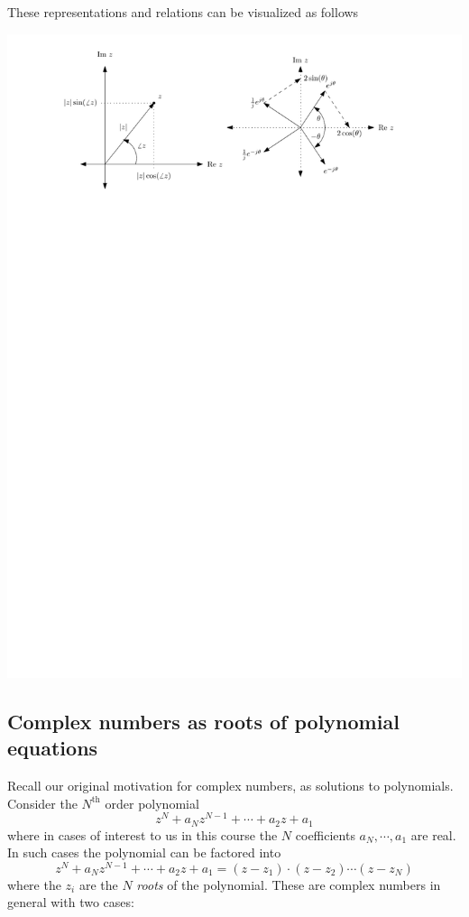 These representations and relations can be visualized as follows
\begin{center}
  \includegraphics[scale=1]{graphics/complex-viz-prereq.pdf}
\end{center}

\subsection*{Complex numbers as roots of polynomial equations}

Recall our original motivation for complex numbers, as solutions to polynomials. Consider the $N^\text{th}$ order polynomial
\[
z^N + a_N z^{N-1} + \cdots + a_2 z + a_1 
\]
where in cases of interest to us in this course the $N$ coefficients $a_{N}, \cdots, a_1$ are real. In such cases the polynomial can be factored into
\[
z^N + a_{N} z^{N-1} + \cdots + a_2 z + a_1 = (z-z_1)\cdot(z-z_2)\cdots(z-z_N)
\]
where the $z_i$ are the $N$ \textit{roots} of the polynomial. These are complex numbers in general with two cases:

